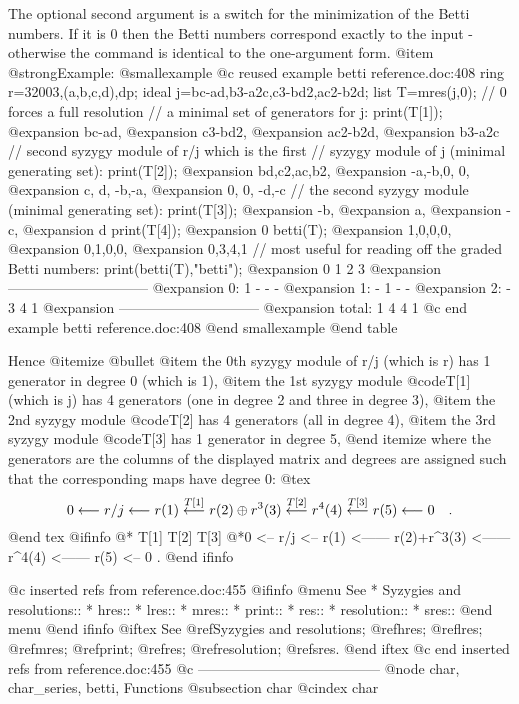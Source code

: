 The optional second argument is a switch for the minimization of the Betti
numbers. If it is 0 then the Betti numbers correspond exactly to the input -
otherwise the command is identical to the one-argument form.
@item @strong{Example:}
@smallexample
@c reused example betti reference.doc:408 
  ring r=32003,(a,b,c,d),dp;
  ideal j=bc-ad,b3-a2c,c3-bd2,ac2-b2d;
  list T=mres(j,0); // 0 forces a full resolution
  // a minimal set of generators for j:
  print(T[1]);
@expansion{} bc-ad,
@expansion{} c3-bd2,
@expansion{} ac2-b2d,
@expansion{} b3-a2c
  // second syzygy module of r/j which is the first
  // syzygy module of j (minimal generating set):
  print(T[2]);
@expansion{} bd,c2,ac,b2,
@expansion{} -a,-b,0, 0, 
@expansion{} c, d, -b,-a,
@expansion{} 0, 0, -d,-c 
  // the second syzygy module (minimal generating set):
  print(T[3]);
@expansion{} -b,
@expansion{} a, 
@expansion{} -c,
@expansion{} d  
  print(T[4]);
@expansion{} 0
  betti(T);
@expansion{} 1,0,0,0,
@expansion{} 0,1,0,0,
@expansion{} 0,3,4,1 
  // most useful for reading off the graded Betti numbers:
  print(betti(T),"betti");
@expansion{}            0     1     2     3
@expansion{} ------------------------------
@expansion{}     0:     1     -     -     -
@expansion{}     1:     -     1     -     -
@expansion{}     2:     -     3     4     1
@expansion{} ------------------------------
@expansion{} total:     1     4     4     1
@c end example betti reference.doc:408
@end smallexample
@end table

Hence
@itemize @bullet
@item the 0th syzygy module of r/j (which is r) has 1 generator in
degree 0 (which is 1),
@item the 1st syzygy module @code{T[1]} (which is j) has 4
generators (one in degree 2 and three in degree 3),
@item the 2nd syzygy
module @code{T[2]} has 4 generators (all in degree 4),
@item the 3rd syzygy module @code{T[3]} has
1 generator in degree 5,
@end itemize
where the generators are the columns of the
displayed matrix and degrees are assigned such that the corresponding maps
have degree 0:
@tex
$$
0 \longleftarrow r/j \longleftarrow r(1)
\buildrel{T[1]}\over{\longleftarrow} r(2) \oplus r^3(3)
\buildrel{T[2]}\over{\longleftarrow} r^4(4)
\buildrel{T[3]}\over{\longleftarrow} r(5)
\longleftarrow 0 \quad .
$$
@end tex
@ifinfo
@*                     T[1]                T[2]           T[3]
@*0 <-- r/j <-- r(1) <------ r(2)+r^3(3) <------ r^4(4) <------ r(5) <-- 0 .
@end ifinfo

@c inserted refs from reference.doc:455
@ifinfo
@menu
See
* Syzygies and resolutions::
* hres::
* lres::
* mres::
* print::
* res::
* resolution::
* sres::
@end menu
@end ifinfo
@iftex
See
@ref{Syzygies and resolutions};
@ref{hres};
@ref{lres};
@ref{mres};
@ref{print};
@ref{res};
@ref{resolution};
@ref{sres}.
@end iftex
@c end inserted refs from reference.doc:455
@c ---------------------------------------
@node char, char_series, betti, Functions
@subsection char
@cindex char

